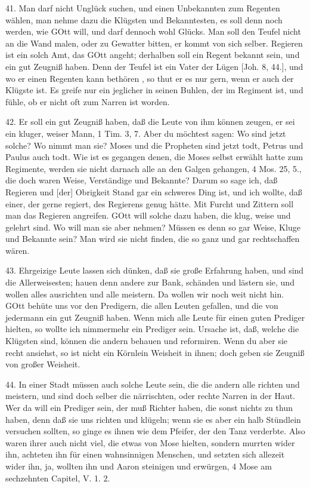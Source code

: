41. Man darf nicht Unglück suchen, und einen Unbekannten zum Regenten wählen, man nehme dazu die Klügsten und Bekanntesten, es soll denn noch werden, wie GOtt will, und darf dennoch wohl Glücks. Man soll den Teufel nicht an die Wand malen, oder zu Gewatter bitten, er kommt von sich selber. Regieren ist ein solch Amt, das GOtt angeht; derhalben soll ein Regent bekannt sein, und ein gut Zeugniß haben. Denn der Teufel ist ein Vater der Lügen [Joh. 8, 44.], und wo er einen Regenten kann bethören
, so thut er es nur gern, wenn er auch der Klügste ist. Es greife nur ein jeglicher in seinen Buhlen, der im Regiment ist, und fühle, ob er nicht oft zum Narren ist worden.

42. Er soll ein gut Zeugniß haben, daß die Leute von ihm können zeugen, er sei ein kluger, weiser Mann, 1 Tim. 3, 7. Aber du möchtest sagen: Wo sind jetzt solche? Wo nimmt man sie? Moses und die Propheten sind jetzt todt, Petrus und Paulus auch todt. Wie ist es gegangen denen, die Moses selbst erwählt hatte zum Regimente, werden sie nicht darnach alle an den Galgen gehangen, 4 Mos. 25, 5., die doch waren Weise, Verständige und Bekannte? Darum so sage ich, daß Regieren und [der] Obrigkeit Stand gar ein schweres Ding ist, und ich wollte, daß einer, der gerne regiert, des Regierens genug hätte. Mit Furcht und Zittern soll man das Regieren angreifen. GOtt will solche dazu haben, die klug, weise und gelehrt sind. Wo will man sie aber nehmen? Müssen es denn so gar Weise, Kluge und Bekannte sein? Man wird sie nicht finden, die so ganz und gar rechtschaffen wären.

43. Ehrgeizige Leute lassen sich dünken, daß sie große Erfahrung haben, und sind die Allerweisesten; hauen denn andere zur Bank, schänden und lästern sie, und wollen alles ausrichten und alle meistern. Da wollen wir noch weit nicht hin. GOtt behüte uns vor den Predigern, die allen Leuten gefallen, und die von jedermann ein gut Zeugniß haben. Wenn mich alle Leute für einen guten Prediger hielten, so wollte ich nimmermehr ein Prediger sein. Ursache ist, daß, welche die Klügsten sind, können die andern behauen und reformiren. Wenn du aber sie recht ansiehst, so ist nicht ein Körnlein Weisheit in ihnen; doch geben sie Zeugniß von großer Weisheit.

44. In einer Stadt müssen auch solche Leute sein, die die andern alle richten und meistern, und sind doch selber die närrischten, oder rechte Narren in der Haut. Wer da will ein Prediger sein, der muß Richter haben, die sonst nichts zu thun haben, denn daß sie uns richten und klügeln; wenn sie es aber ein halb Stündlein versuchen sollten, so ginge es ihnen wie dem Pfeifer, der den Tanz verderbte. Also waren ihrer auch nicht viel, die etwas von Mose hielten, sondern murrten wider ihn, achteten ihn für einen wahnsinnigen Menschen, und setzten sich allezeit wider ihn, ja, wollten ihn und Aaron steinigen und erwürgen, 4 Mose am sechzehnten Capitel, V. 1. 2.

